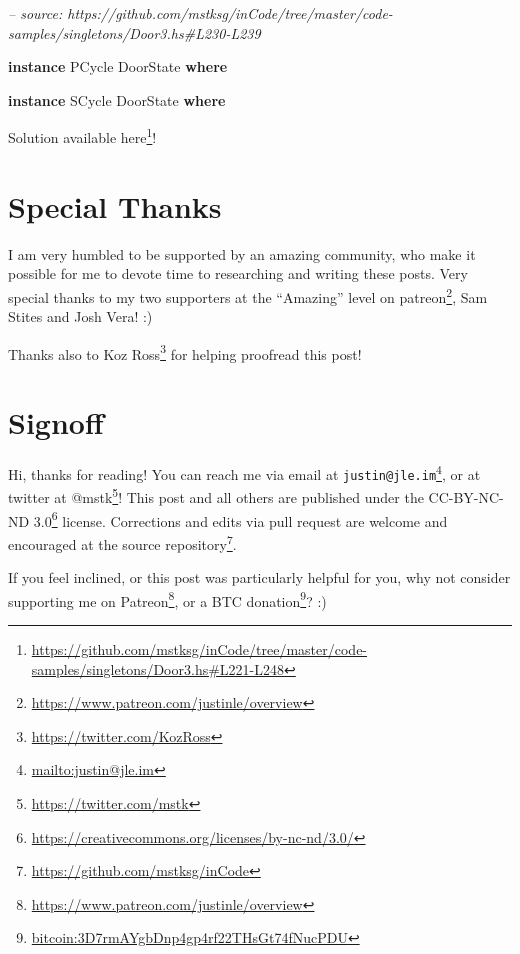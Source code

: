 \documentclass[]{article}
\newenvironment{Shaded}{}{}
\newcommand{\CommentTok}[1]{\textcolor[rgb]{0.38,0.63,0.69}{\textit{#1}}}
\newcommand{\DataTypeTok}[1]{\textcolor[rgb]{0.56,0.13,0.00}{#1}}
\newcommand{\KeywordTok}[1]{\textcolor[rgb]{0.00,0.44,0.13}{\textbf{#1}}}
\renewcommand{\href}[2]{#2\footnote{\url{#1}}}
\begin{document}
\begin{enumerate}
\begin{Shaded}
\begin{Highlighting}[]
\CommentTok{-- source: https://github.com/mstksg/inCode/tree/master/code-samples/singletons/Door3.hs#L230-L239}

\KeywordTok{instance} \DataTypeTok{PCycle} \DataTypeTok{DoorState} \KeywordTok{where}

\KeywordTok{instance} \DataTypeTok{SCycle} \DataTypeTok{DoorState} \KeywordTok{where}
\end{Highlighting}
\end{Shaded}

  Solution available
  \href{https://github.com/mstksg/inCode/tree/master/code-samples/singletons/Door3.hs\#L221-L248}{here}!
\end{enumerate}

\hypertarget{special-thanks}{%
\section{Special Thanks}\label{special-thanks}}

I am very humbled to be supported by an amazing community, who make it possible
for me to devote time to researching and writing these posts. Very special
thanks to my two supporters at the ``Amazing'' level on
\href{https://www.patreon.com/justinle/overview}{patreon}, Sam Stites and Josh
Vera! :)

Thanks also to \href{https://twitter.com/KozRoss}{Koz Ross} for helping
proofread this post!

\hypertarget{signoff}{%
\section{Signoff}\label{signoff}}

Hi, thanks for reading! You can reach me via email at
\href{mailto:justin@jle.im}{\nolinkurl{justin@jle.im}}, or at twitter at
\href{https://twitter.com/mstk}{@mstk}! This post and all others are published
under the \href{https://creativecommons.org/licenses/by-nc-nd/3.0/}{CC-BY-NC-ND
3.0} license. Corrections and edits via pull request are welcome and encouraged
at \href{https://github.com/mstksg/inCode}{the source repository}.

If you feel inclined, or this post was particularly helpful for you, why not
consider \href{https://www.patreon.com/justinle/overview}{supporting me on
Patreon}, or a \href{bitcoin:3D7rmAYgbDnp4gp4rf22THsGt74fNucPDU}{BTC donation}?
:)
\end{document}
